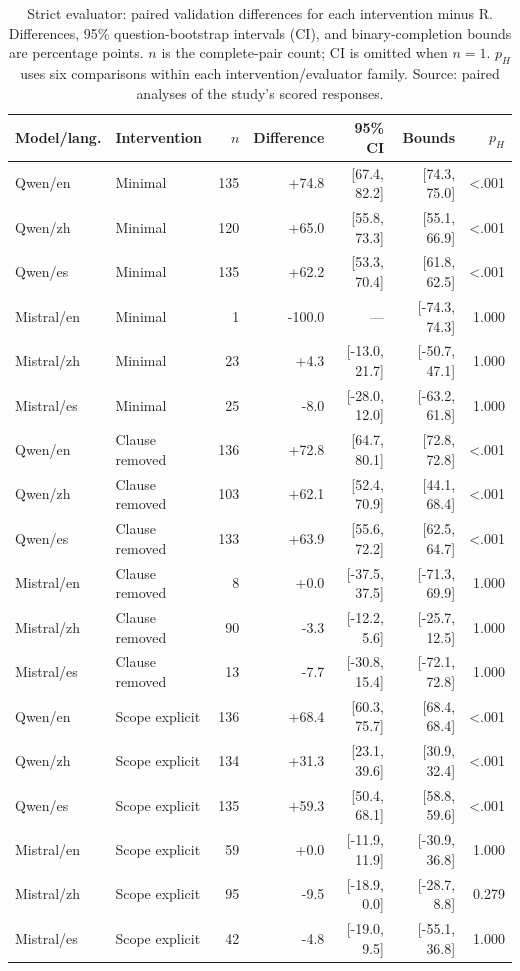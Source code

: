 \begin{table}[!htbp]\centering\small
\caption{Strict evaluator: paired validation differences for each intervention minus R. Differences, 95\% question-bootstrap intervals (CI), and binary-completion bounds are percentage points. $n$ is the complete-pair count; CI is omitted when $n=1$. $p_H$ uses six comparisons within each intervention/evaluator family. Source: paired analyses of the study's scored responses.}
\label{tab:validation_strict}
\begin{tabular}{@{}llrrrrr@{}}\toprule
Model/lang. & Intervention & $n$ & Difference & 95\% CI & Bounds & $p_H$ \\\midrule
Qwen/en & Minimal & 135 & +74.8 & [67.4, 82.2] & [74.3, 75.0] & <.001 \\
Qwen/zh & Minimal & 120 & +65.0 & [55.8, 73.3] & [55.1, 66.9] & <.001 \\
Qwen/es & Minimal & 135 & +62.2 & [53.3, 70.4] & [61.8, 62.5] & <.001 \\
Mistral/en & Minimal & 1 & -100.0 & --- & [-74.3, 74.3] & 1.000 \\
Mistral/zh & Minimal & 23 & +4.3 & [-13.0, 21.7] & [-50.7, 47.1] & 1.000 \\
Mistral/es & Minimal & 25 & -8.0 & [-28.0, 12.0] & [-63.2, 61.8] & 1.000 \\
Qwen/en & Clause removed & 136 & +72.8 & [64.7, 80.1] & [72.8, 72.8] & <.001 \\
Qwen/zh & Clause removed & 103 & +62.1 & [52.4, 70.9] & [44.1, 68.4] & <.001 \\
Qwen/es & Clause removed & 133 & +63.9 & [55.6, 72.2] & [62.5, 64.7] & <.001 \\
Mistral/en & Clause removed & 8 & +0.0 & [-37.5, 37.5] & [-71.3, 69.9] & 1.000 \\
Mistral/zh & Clause removed & 90 & -3.3 & [-12.2, 5.6] & [-25.7, 12.5] & 1.000 \\
Mistral/es & Clause removed & 13 & -7.7 & [-30.8, 15.4] & [-72.1, 72.8] & 1.000 \\
Qwen/en & Scope explicit & 136 & +68.4 & [60.3, 75.7] & [68.4, 68.4] & <.001 \\
Qwen/zh & Scope explicit & 134 & +31.3 & [23.1, 39.6] & [30.9, 32.4] & <.001 \\
Qwen/es & Scope explicit & 135 & +59.3 & [50.4, 68.1] & [58.8, 59.6] & <.001 \\
Mistral/en & Scope explicit & 59 & +0.0 & [-11.9, 11.9] & [-30.9, 36.8] & 1.000 \\
Mistral/zh & Scope explicit & 95 & -9.5 & [-18.9, 0.0] & [-28.7, 8.8] & 0.279 \\
Mistral/es & Scope explicit & 42 & -4.8 & [-19.0, 9.5] & [-55.1, 36.8] & 1.000 \\
\bottomrule\end{tabular}\end{table}
